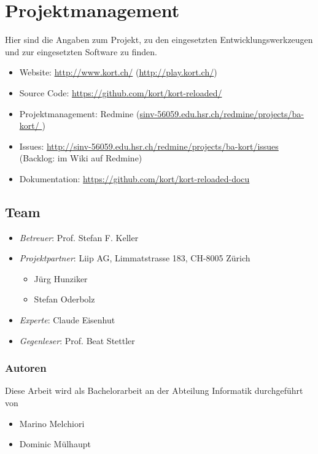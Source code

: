\chapter{Projektmanagement}
\label{pm-projektmanagement}
Hier sind die Angaben zum Projekt, zu den eingesetzten Entwicklungswerkzeugen und zur eingesetzten Software zu finden.

\begin{itemize}
    \item Website: \url{http://www.kort.ch/} (\url{http://play.kort.ch/})
    \item Source Code: \url{https://github.com/kort/kort-reloaded/}
    \item Projektmanagement: Redmine (\url{sinv-56059.edu.hsr.ch/redmine/projects/ba-kort/ })
    \item Issues: \url{http://sinv-56059.edu.hsr.ch/redmine/projects/ba-kort/issues}  (Backlog: im Wiki auf Redmine) 
    \item Dokumentation: \url{https://github.com/kort/kort-reloaded-docu}
\end{itemize}

\section{Team}
\label{pm-team}
\begin{itemize}
	\item \textit{Betreuer}: Prof. Stefan F. Keller
	\item \textit{Projektpartner}: Liip AG, Limmatstrasse 183, CH-8005 Zürich
	\begin{itemize}
		\item Jürg Hunziker
		\item Stefan Oderbolz
	\end{itemize}
	\item \textit{Experte}: Claude Eisenhut
	\item \textit{Gegenleser}: Prof. Beat Stettler
\end{itemize}

\subsection*{Autoren}
\label{pm-team-autoren}
Diese Arbeit wird als Bachelorarbeit an der Abteilung Informatik durchgeführt von
\begin{itemize}
	\item Marino Melchiori
	\item Dominic Mülhaupt
\end{itemize}


